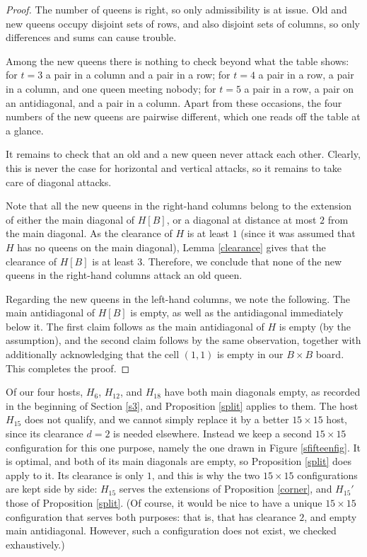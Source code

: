 \documentclass[10pt,a4paper]{article}
\theoremstyle{definition}
\begin{document}
\begin{proof}
The number of queens is right, so only admissibility is at issue. Old and new
queens occupy disjoint sets of rows, and also disjoint sets of columns, so only
differences and sums can cause trouble.

Among the new queens there is nothing to check beyond what the table shows: for
$t=3$ a pair in a column and a pair in a row; for $t=4$ a pair in a row, a pair
in a column, and one queen meeting nobody; for $t=5$ a pair in a row, a pair on
an antidiagonal, and a pair in a column. Apart from these occasions, the four
numbers of the new queens are pairwise different, which one reads off the table
at a glance.

It remains to check that an old and a new queen never attack each other. Clearly, this is never the case for horizontal and vertical attacks, so it remains to take care of diagonal attacks.

Note that all the new queens in the right-hand columns belong to the extension of either the main diagonal of $H[B]$, or a diagonal at distance at most $2$ from the main diagonal. As the clearance of $H$ is at least $1$ (since it was assumed that $H$ has no queens on the main diagonal), Lemma \ref{clearance} gives that the clearance of $H[B]$ is at least $3$. Therefore, we conclude that none of the new queens in the right-hand columns attack an old queen.

Regarding the new queens in the left-hand columns, we note the following. The main antidiagonal of $H[B]$ is empty, as well as the antidiagonal immediately below it. The first claim follows as the main antidiagonal of $H$ is empty (by the assumption), and the second claim follows by the same observation, together with additionally acknowledging that the cell $(1,1)$ is empty in our $B\times B$ board. This completes the proof.
\end{proof}

Of our four hosts, $H_6$, $H_{12}$, and $H_{18}$ have both main diagonals empty,
as recorded in the beginning of Section \ref{s3}, and Proposition \ref{split} applies to them.
The host $H_{15}$ does not qualify, and we cannot simply replace it by a better
$15\times15$ host, since its clearance $d=2$ is needed elsewhere. Instead we
keep a second $15\times15$ configuration for this one purpose, namely the one drawn in Figure \ref{sfifteenfig}. It is optimal, and both of its main
diagonals are empty, so Proposition \ref{split} does apply to it. Its clearance is only $1$, and this is why the two
$15\times15$ configurations are kept side by side: $H_{15}$ serves the
extensions of Proposition \ref{corner}, and $H_{15}'$ those of
Proposition \ref{split}. (Of course, it would be nice to have a unique $15\times 15$ configuration that serves both purposes: that is, that has clearance $2$, and empty main antidiagonal. However, such a configuration does not exist, we checked exhaustively.)
\end{document}
